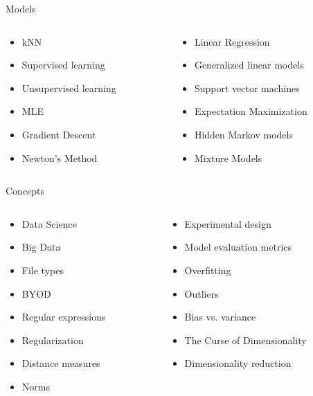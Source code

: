 \documentclass[aspectratio=169]{beamer}
\begin{document}
\begin{frame}{Models}

\begin{columns}
\begin{column}{0.5\textwidth}
\begin{itemize}
\item kNN
\item Supervised learning
\item Unsupervised learning
\item MLE
\item Gradient Descent
\item Newton's Method
\end{itemize}
\end{column}
\begin{column}{0.5\textwidth}
\begin{itemize}
\item Linear Regression
\item Generalized linear models
\item Support vector machines
\item Expectation Maximization
\item Hidden Markov models
\item Mixture Models
\end{itemize}
\end{column}
\end{columns}
\end{frame}
\begin{frame}{Concepts}

\begin{columns}
\begin{column}{0.5\textwidth}
\begin{itemize}
\item Data Science
\item Big Data
\item File types
\item BYOD
\item Regular expressions
\item Regularization
\item Distance measures
\item Norms
\end{itemize}
\end{column}
\begin{column}{0.5\textwidth}
\begin{itemize}
\item Experimental design
\item Model evaluation metrics
\item Overfitting
\item Outliers
\item Bias vs. variance
\item The Curse of Dimensionality
\item Dimensionality reduction
\end{itemize}
\end{column}
\end{columns}
\end{frame}
\end{document}
